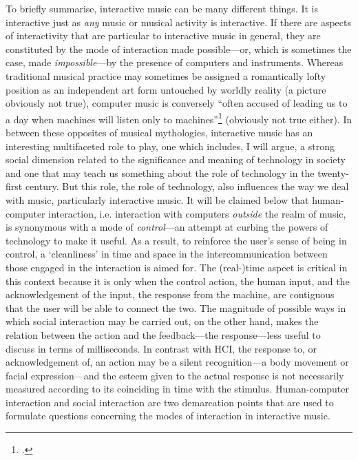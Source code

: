 To briefly summarise, interactive music can be many different things. It is interactive just as \emph{any} music or musical activity is interactive. If there are aspects of interactivity that are particular to interactive music in general, they are constituted by the mode of interaction made possible---or, which is sometimes the case, made \emph{impossible}---by the presence of computers and  instruments. Whereas traditional musical practice may sometimes be assigned a romantically lofty position as an independent art form untouched by worldly reality (a picture obviously not true), computer music is conversely ``often accused of leading us to a day when machines will listen only to machines''\footcite[6]{rowe01} (obviously not true either). In between these opposites of musical mythologies, interactive music has an interesting multifaceted role to play, one which includes, I will argue, a strong social dimension related to the significance and meaning of technology in society and one that may teach us something about the role of technology in the twenty-first century. But this role, the role of technology, also influences the way we deal with music, particularly interactive music. It will be claimed below that human-computer interaction, i.e. interaction with computers \emph{outside} the realm of music, is synonymous with a mode of \emph{control}---an attempt at curbing the powers of technology to make it useful. As a result, to reinforce the user's sense of being in control, a `cleanliness' in time and space in the intercommunication between those engaged in the interaction is aimed for. The (real-)time aspect is critical in this context because it is only when the control action, the human input, and the acknowledgement of the input, the response from the machine, are contiguous that the user will be able to connect the two. The magnitude of possible ways in which social interaction may be carried out, on the other hand, makes the relation between the action and the feedback---the response---less useful to discuss in terms of milliseconds. In contrast with HCI, the response to, or acknowledgement of, an action may be a silent recognition---a body movement or facial expression---and the esteem given to the actual response is not necessarily measured according to its coinciding in time with the stimulus. Human-computer interaction and social interaction are two demarcation points that are used to formulate questions concerning the modes of interaction in interactive music.


